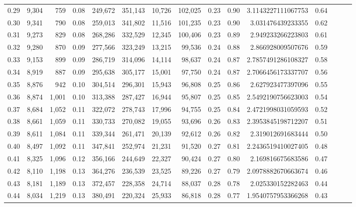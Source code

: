 \begin{tabular}{rrrrrrrrrrrrrrr}
0.29 &  9,304 &    759 &  0.08 &  249,672 &  351,143 &   10,726 &  102,025 &  0.23 &  0.90 &      3.1143227111067753 &      0.64 \\
0.30 &  9,341 &    790 &  0.08 &  259,013 &  341,802 &   11,516 &  101,235 &  0.23 &  0.90 &       3.031476439233355 &      0.62 \\
0.31 &  9,273 &    829 &  0.08 &  268,286 &  332,529 &   12,345 &  100,406 &  0.23 &  0.89 &       2.949233266223803 &      0.61 \\
0.32 &  9,280 &    870 &  0.09 &  277,566 &  323,249 &   13,215 &   99,536 &  0.24 &  0.88 &       2.866928009507676 &      0.59 \\
0.33 &  9,153 &    899 &  0.09 &  286,719 &  314,096 &   14,114 &   98,637 &  0.24 &  0.87 &      2.7857491286108327 &      0.58 \\
0.34 &  8,919 &    887 &  0.09 &  295,638 &  305,177 &   15,001 &   97,750 &  0.24 &  0.87 &      2.7066456173337707 &      0.56 \\
0.35 &  8,876 &    942 &  0.10 &  304,514 &  296,301 &   15,943 &   96,808 &  0.25 &  0.86 &       2.627923477397096 &      0.55 \\
0.36 &  8,874 &  1,001 &  0.10 &  313,388 &  287,427 &   16,944 &   95,807 &  0.25 &  0.85 &      2.5492190756623003 &      0.54 \\
0.37 &  8,684 &  1,052 &  0.11 &  322,072 &  278,743 &   17,996 &   94,755 &  0.25 &  0.84 &      2.4721998031059593 &      0.52 \\
0.38 &  8,661 &  1,059 &  0.11 &  330,733 &  270,082 &   19,055 &   93,696 &  0.26 &  0.83 &      2.3953845198712207 &      0.51 \\
0.39 &  8,611 &  1,084 &  0.11 &  339,344 &  261,471 &   20,139 &   92,612 &  0.26 &  0.82 &       2.319012691683444 &      0.50 \\
0.40 &  8,497 &  1,092 &  0.11 &  347,841 &  252,974 &   21,231 &   91,520 &  0.27 &  0.81 &      2.2436519410027405 &      0.48 \\
0.41 &  8,325 &  1,096 &  0.12 &  356,166 &  244,649 &   22,327 &   90,424 &  0.27 &  0.80 &       2.169816675683586 &      0.47 \\
0.42 &  8,110 &  1,198 &  0.13 &  364,276 &  236,539 &   23,525 &   89,226 &  0.27 &  0.79 &      2.0978882670663674 &      0.46 \\
0.43 &  8,181 &  1,189 &  0.13 &  372,457 &  228,358 &   24,714 &   88,037 &  0.28 &  0.78 &       2.025330152282463 &      0.44 \\
0.44 &  8,034 &  1,219 &  0.13 &  380,491 &  220,324 &   25,933 &   86,818 &  0.28 &  0.77 &      1.9540757953366268 &      0.43 \\

\end{tabular}
